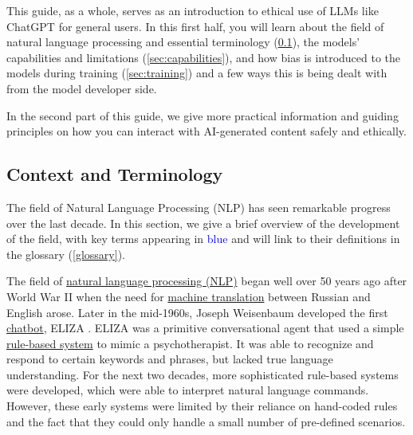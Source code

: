 \documentclass[12pt]{article}
\begin{document}
This guide, as a whole, serves as an introduction to ethical use of LLMs like ChatGPT for general users. In this first half, you will learn about the field of natural language processing and essential terminology (\ref{sec:context}), the models' capabilities and limitations (\ref{sec:capabilities}), and how bias is introduced to the models during training (\ref{sec:training}) and a few ways this is being dealt with from the model developer side. 

In the second part of this guide, we give more practical information and guiding principles on how you can interact with AI-generated content safely and ethically.


\subsection{Context and Terminology}\label{sec:context}
The field of Natural Language Processing (NLP) has seen remarkable progress over the last decade. In this section, we give a brief overview of the development of the field, with key terms appearing in \textcolor{blue}{blue} and will link to their definitions in the glossary (\ref{glossary}). 

The field of \hyperref[item:nlp]{natural language processing (NLP)} began well over 50 years ago after World War II when the need for \hyperref[item:machine-translation]{machine translation} between Russian and English arose. Later in the mid-1960s, Joseph Weisenbaum developed the first \hyperref[item:chatbot]{chatbot}, ELIZA \cite{eliza}. ELIZA was a primitive conversational agent that used a simple \hyperref[item:rule-based]{rule-based system} to mimic a psychotherapist. It was able to recognize and respond to certain keywords and phrases, but lacked true language understanding. For the next two decades, more sophisticated rule-based systems were developed, which were able to interpret natural language commands. However, these early systems were limited by their reliance on hand-coded rules and the fact that they could only handle a small number of pre-defined scenarios.
\end{document}
